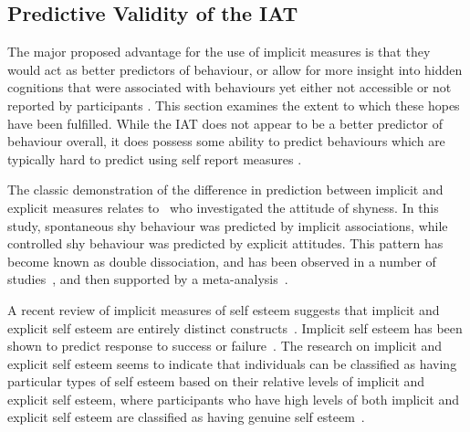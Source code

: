 


\subsection{Predictive Validity of the IAT}
\label{sec:pred-valid-iat}


The major proposed advantage for the use of implicit measures is that they would act as better predictors of behaviour, or allow for more insight into hidden cognitions that were associated with behaviours yet either not accessible or not reported by participants \cite{Greenwald1998}. This section examines the extent to which these hopes have been fulfilled. While the IAT does not appear to be a better predictor of behaviour overall, it does possess some ability to predict behaviours which are typically hard to predict using self report measures \cite{Greenwald2009}. 

The classic demonstration of the difference in prediction between implicit and explicit measures relates to~\cite{Asendorpf2002} who investigated the attitude of shyness. In this study, spontaneous shy behaviour was predicted by implicit associations, while controlled shy behaviour was predicted by explicit attitudes. This pattern has become known as double dissociation, and has been observed in a number of studies~\cite{Perugini2005}, and  then supported by  a meta-analysis~\cite{Hofmann2005}. 

A recent review of implicit measures of self esteem suggests that implicit and explicit self esteem are entirely distinct constructs~\cite{Rudolph2008}. Implicit self esteem has been shown to predict response to success or failure~\cite{Greenwald2000}. 
The research on implicit and explicit self esteem seems to indicate that individuals can be classified as having particular types of self esteem based on their relative levels of implicit and explicit self esteem, where participants who have high levels of both implicit and explicit self esteem are classified as having genuine self esteem~\cite{Meagher2004}. 

